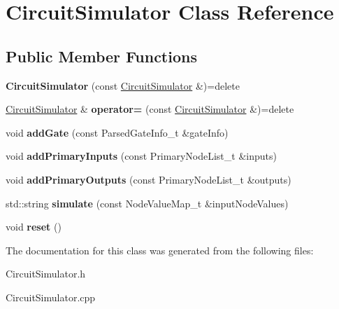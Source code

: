 \hypertarget{classCircuitSimulator}{}\section{Circuit\+Simulator Class Reference}
\label{classCircuitSimulator}
\subsection*{Public Member Functions}
\begin{DoxyCompactItemize}
\item 
{\bfseries Circuit\+Simulator} (const \hyperlink{classCircuitSimulator}{Circuit\+Simulator} \&)=delete\hypertarget{classCircuitSimulator_ac61805a6a803a985fc56203deda3f7a9}{}\label{classCircuitSimulator_ac61805a6a803a985fc56203deda3f7a9}

\item 
\hyperlink{classCircuitSimulator}{Circuit\+Simulator} \& {\bfseries operator=} (const \hyperlink{classCircuitSimulator}{Circuit\+Simulator} \&)=delete\hypertarget{classCircuitSimulator_a744d24f5ff23c79396930b929e54cd66}{}\label{classCircuitSimulator_a744d24f5ff23c79396930b929e54cd66}

\item 
void {\bfseries add\+Gate} (const Parsed\+Gate\+Info\+\_\+t \&gate\+Info)\hypertarget{classCircuitSimulator_a3f58ba70b4e2f16ba4c78a26359ee172}{}\label{classCircuitSimulator_a3f58ba70b4e2f16ba4c78a26359ee172}

\item 
void {\bfseries add\+Primary\+Inputs} (const Primary\+Node\+List\+\_\+t \&inputs)\hypertarget{classCircuitSimulator_a70e8ba972ffcec594f07ddd0c829469d}{}\label{classCircuitSimulator_a70e8ba972ffcec594f07ddd0c829469d}

\item 
void {\bfseries add\+Primary\+Outputs} (const Primary\+Node\+List\+\_\+t \&outputs)\hypertarget{classCircuitSimulator_aa243acfbb5baea75e5bdd4185f56020b}{}\label{classCircuitSimulator_aa243acfbb5baea75e5bdd4185f56020b}

\item 
std\+::string {\bfseries simulate} (const Node\+Value\+Map\+\_\+t \&input\+Node\+Values)\hypertarget{classCircuitSimulator_a81d8944f30b285d590809f71cfa86c3c}{}\label{classCircuitSimulator_a81d8944f30b285d590809f71cfa86c3c}

\item 
void {\bfseries reset} ()\hypertarget{classCircuitSimulator_a956e47ce8e344e707b9124803263c939}{}\label{classCircuitSimulator_a956e47ce8e344e707b9124803263c939}

\end{DoxyCompactItemize}


The documentation for this class was generated from the following files\+:\begin{DoxyCompactItemize}
\item 
Circuit\+Simulator.\+h\item 
Circuit\+Simulator.\+cpp\end{DoxyCompactItemize}
